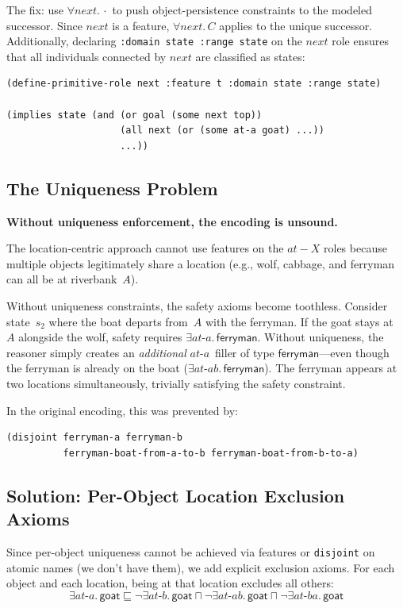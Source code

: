 \documentclass[11pt,a4paper]{article}
\newcommand{\DLsome}[2]{\exists #1.\,#2}
\newcommand{\DLall}[2]{\forall #1.\,#2}
\newcommand{\DLand}{\sqcap}
\newcommand{\DLnot}{\neg}
\newcommand{\DLsub}{\sqsubseteq}
\newcommand{\concept}[1]{\ensuremath{\mathsf{#1}}}
\newcommand{\role}[1]{\ensuremath{\mathit{#1}}}
\begin{document}
The fix: use $\DLall{\role{next}}{\cdot}$ to push object-persistence
constraints to the modeled successor.  Since \role{next} is a feature,
$\DLall{\role{next}}{C}$ applies to the unique successor.  Additionally,
declaring \texttt{:domain state :range state} on the \role{next} role
ensures that all individuals connected by \role{next} are classified as
states:
\begin{lstlisting}[style=racer]
(define-primitive-role next :feature t :domain state :range state)

(implies state (and (or goal (some next top))
                    (all next (or (some at-a goat) ...))
                    ...))
\end{lstlisting}

\subsection{The Uniqueness Problem}

\textbf{Without uniqueness enforcement, the encoding is unsound.}

The location-centric approach cannot use features on the \role{at-X}
roles because multiple objects legitimately share a location (e.g.,
wolf, cabbage, and ferryman can all be at riverbank~$A$).

Without uniqueness constraints, the safety axioms become toothless.
Consider state~$s_2$ where the boat departs from~$A$ with the ferryman.
If the goat stays at~$A$ alongside the wolf, safety requires
$\DLsome{\role{at\text{-}a}}{\concept{ferryman}}$.  Without uniqueness,
the reasoner simply creates an \emph{additional}
\role{at\text{-}a}~filler of type \concept{ferryman}---even though the
ferryman is already on the boat
($\DLsome{\role{at\text{-}ab}}{\concept{ferryman}}$).  The ferryman
appears at two locations simultaneously, trivially satisfying the safety
constraint.

In the original encoding, this was prevented by:
\begin{lstlisting}[style=racer]
(disjoint ferryman-a ferryman-b
          ferryman-boat-from-a-to-b ferryman-boat-from-b-to-a)
\end{lstlisting}

\subsection{Solution: Per-Object Location Exclusion Axioms}

Since per-object uniqueness cannot be achieved via features or
\texttt{disjoint} on atomic names (we don't have them), we add explicit
exclusion axioms.  For each object and each location, being at that
location excludes all others:
\[
\DLsome{\role{at\text{-}a}}{\concept{goat}} \DLsub
  \DLnot\DLsome{\role{at\text{-}b}}{\concept{goat}} \DLand
  \DLnot\DLsome{\role{at\text{-}ab}}{\concept{goat}} \DLand
  \DLnot\DLsome{\role{at\text{-}ba}}{\concept{goat}}
\]
\end{document}

